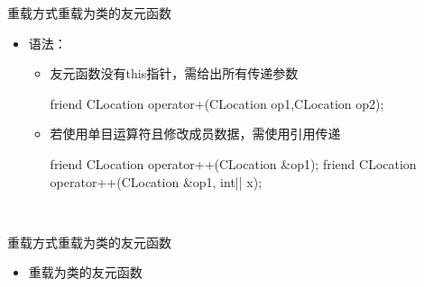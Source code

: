 \begin{frame}[t, fragile]{重载方式}{重载为类的友元函数}%
  \stretchon
  \begin{itemize}
  \item 语法：
    \begin{itemize}
    \item 友元函数\alert{没有this指针}，需给出所有传递参数
      \begin{cppcode}
friend CLocation operator+(CLocation op1,CLocation op2);
      \end{cppcode}
    \item 若使用单目运算符且修改成员数据，\alert{需使用引用传递}
      \begin{cpptt}
friend CLocation operator++(CLocation &op1);
friend CLocation operator++(CLocation &op1, int|| x);
      \end{cpptt}
      \\ \vspace{4ex}
      \hfill {}
    \end{itemize}
  \end{itemize}
  \stretchoff
\end{frame}

\begin{frame}[t, fragile]{重载方式}{重载为类的友元函数}%
  \begin{itemize}
  \item 重载为类的友元函数\\
    \begin{center}
    \end{center}
  \end{itemize}
\end{frame}

